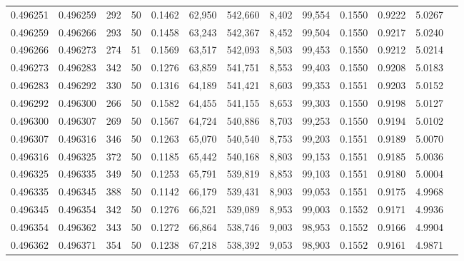 \begin{tabular}{rrrrrrrrrrrrr}
0.496251 & 0.496259 & 292 &  50 &                                     0.1462 &  62,950 & 542,660 &   8,402 &  99,554 & 0.1550 & 0.9222 & 5.0267 \\
0.496259 & 0.496266 & 293 &  50 &                                     0.1458 &  63,243 & 542,367 &   8,452 &  99,504 & 0.1550 & 0.9217 & 5.0240 \\
0.496266 & 0.496273 & 274 &  51 &                                     0.1569 &  63,517 & 542,093 &   8,503 &  99,453 & 0.1550 & 0.9212 & 5.0214 \\
0.496273 & 0.496283 & 342 &  50 &                                     0.1276 &  63,859 & 541,751 &   8,553 &  99,403 & 0.1550 & 0.9208 & 5.0183 \\
0.496283 & 0.496292 & 330 &  50 &                                     0.1316 &  64,189 & 541,421 &   8,603 &  99,353 & 0.1551 & 0.9203 & 5.0152 \\
0.496292 & 0.496300 & 266 &  50 &                                     0.1582 &  64,455 & 541,155 &   8,653 &  99,303 & 0.1550 & 0.9198 & 5.0127 \\
0.496300 & 0.496307 & 269 &  50 &                                     0.1567 &  64,724 & 540,886 &   8,703 &  99,253 & 0.1550 & 0.9194 & 5.0102 \\
0.496307 & 0.496316 & 346 &  50 &                                     0.1263 &  65,070 & 540,540 &   8,753 &  99,203 & 0.1551 & 0.9189 & 5.0070 \\
0.496316 & 0.496325 & 372 &  50 &                                     0.1185 &  65,442 & 540,168 &   8,803 &  99,153 & 0.1551 & 0.9185 & 5.0036 \\
0.496325 & 0.496335 & 349 &  50 &                                     0.1253 &  65,791 & 539,819 &   8,853 &  99,103 & 0.1551 & 0.9180 & 5.0004 \\
0.496335 & 0.496345 & 388 &  50 &                                     0.1142 &  66,179 & 539,431 &   8,903 &  99,053 & 0.1551 & 0.9175 & 4.9968 \\
0.496345 & 0.496354 & 342 &  50 &                                     0.1276 &  66,521 & 539,089 &   8,953 &  99,003 & 0.1552 & 0.9171 & 4.9936 \\
0.496354 & 0.496362 & 343 &  50 &                                     0.1272 &  66,864 & 538,746 &   9,003 &  98,953 & 0.1552 & 0.9166 & 4.9904 \\
0.496362 & 0.496371 & 354 &  50 &                                     0.1238 &  67,218 & 538,392 &   9,053 &  98,903 & 0.1552 & 0.9161 & 4.9871 \\

\end{tabular}
